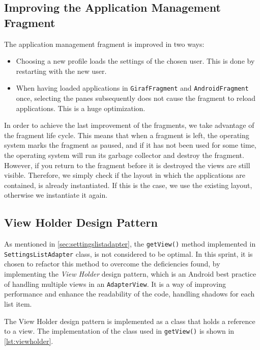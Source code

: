 \subsection{Improving the Application Management Fragment}

The application management fragment is improved in two ways:

\begin{itemize}
\item 
Choosing a new profile loads the settings of the chosen user.
This is done by restarting \settingsactivity with the new user.
\item
When having loaded applications in \lstinline|GirafFragment| and \lstinline|AndroidFragment| once, selecting the panes subsequently does not cause the fragment to reload applications. 
This is a huge optimization.
\end{itemize}

In order to achieve the last improvement of the fragments, we take advantage of the fragment life cycle. 
This means that when a fragment is left, the operating system marks the fragment as paused, and if it has not been used for some time, the operating system will run its garbage collector and destroy the fragment. 
However, if you return to the fragment before it is destroyed the views are still visible. 
Therefore, we simply check if the layout in which the applications are contained, is already instantiated.
If this is the case, we use the existing layout, otherwise we instantiate it again.

\subsection{View Holder Design Pattern}
As mentioned in \cref{sec:settingslistadapter}, the \lstinline|getView()| method implemented in \lstinline|SettingsListAdapter| class, is not considered to be optimal.
In this sprint, it is chosen to refactor this method to overcome the deficiencies found, by implementing the \textit{View Holder} design pattern, which is an Android best practice of handling multiple views in an \lstinline|AdapterView|\cite{listViewsPerformance}.
It is a way of improving performance and enhance the readability of the code, handling shadows for each list item.

The View Holder design pattern is implemented as a class that holds a reference to a view. 
The implementation of the class used in \lstinline|getView()| is shown in \cref{lst:viewholder}.

